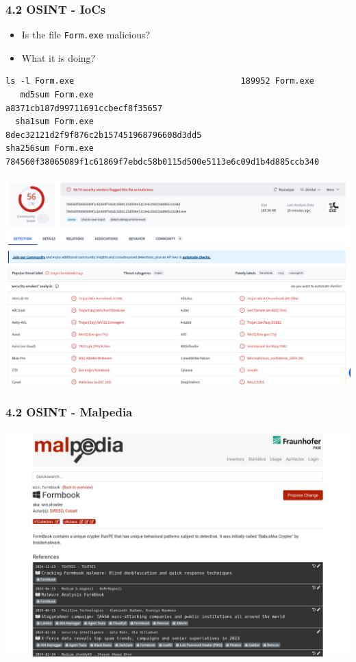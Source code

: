 \begin{frame}[fragile]
  \frametitle{4.2 OSINT - IoCs}
    \begin{itemize}
	    \item Is the file \texttt{Form.exe} malicious?
            \item What it is doing?
    \end{itemize}
  \begin{lstlisting}[basicstyle=\tiny]
    ls -l Form.exe				                    189952 Form.exe
   md5sum Form.exe		                   a8371cb187d99711691ccbecf8f35657
  sha1sum Form.exe                         8dec32121d2f9f876c2b157451968796608d3dd5
sha256sum Form.exe 784560f38065089f1c61869f7ebdc58b0115d500e5113e6c09d1b4d885ccb340
  \end{lstlisting}
  \includegraphics[scale=0.17]{images/VT_1.png}
\end{frame}


\begin{frame}[fragile]
  \frametitle{4.2 OSINT - Malpedia}
  \includegraphics[scale=0.24]{images/malpedia.png}
\end{frame}


